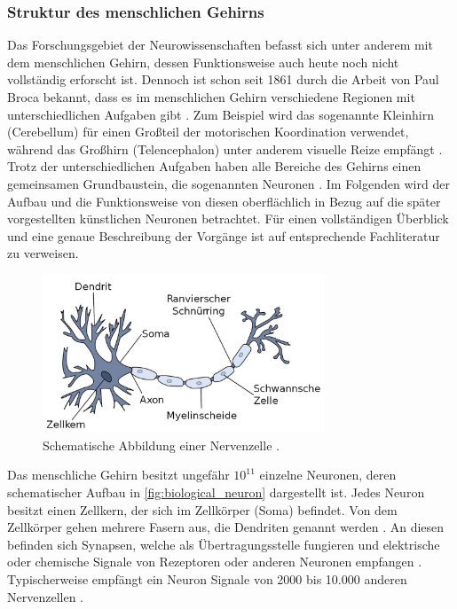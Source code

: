\subsubsection{Struktur des menschlichen Gehirns}
Das Forschungsgebiet der Neurowissenschaften befasst sich unter anderem mit dem menschlichen Gehirn, dessen Funktionsweise auch heute noch nicht vollständig erforscht ist. Dennoch ist schon seit 1861 durch die Arbeit von Paul Broca bekannt, dass es im menschlichen Gehirn verschiedene Regionen mit unterschiedlichen Aufgaben gibt \cite{russell2013kunstliche}. Zum Beispiel wird das sogenannte Kleinhirn (Cerebellum) für einen Großteil der motorischen Koordination verwendet, während das Großhirn (Telencephalon) unter anderem visuelle Reize empfängt \cite{kriesel2008kleiner}. Trotz der unterschiedlichen Aufgaben haben alle Bereiche des Gehirns einen gemeinsamen Grundbaustein, die sogenannten Neuronen \cite{russell2013kunstliche}. Im Folgenden wird der Aufbau und die Funktionsweise von diesen oberflächlich in Bezug auf die später vorgestellten künstlichen Neuronen betrachtet. Für einen vollständigen Überblick und eine genaue Beschreibung der Vorgänge ist auf entsprechende Fachliteratur zu verweisen.\\
\begin{figure}[h]
	\centering
	\includegraphics[width=0.75\textwidth]{./img/biologial_neuron.JPG} 
	\caption{Schematische Abbildung einer Nervenzelle \cite{kriesel2008kleiner}.}
	\label{fig:biological_neuron}
\end{figure}
Das menschliche Gehirn besitzt ungefähr ${10}^{11}$ einzelne Neuronen, deren schematischer Aufbau in \autoref{fig:biological_neuron} dargestellt ist. Jedes Neuron besitzt einen Zellkern, der sich im Zellkörper (Soma) befindet. Von dem Zellkörper gehen mehrere Fasern aus, die Dendriten genannt werden \cite{russell2013kunstliche}. An diesen befinden sich Synapsen, welche als Übertragungsstelle fungieren und elektrische oder chemische Signale von Rezeptoren oder anderen Neuronen empfangen \cite{kriesel2008kleiner}. Typischerweise empfängt ein Neuron Signale von 2000 bis 10.000 anderen Nervenzellen \cite{zell2003simulation}. \\ %
